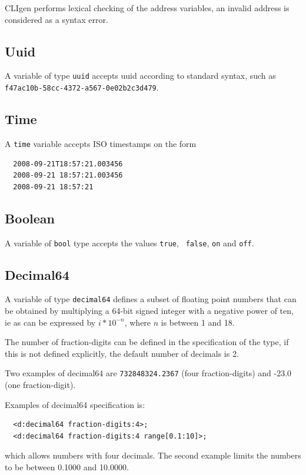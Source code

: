 \documentclass[a4paper, 10pt] {article}
\begin{document}
CLIgen performs lexical checking of the address variables, an invalid
address is considered as a syntax error.

\subsection{Uuid}

A variable of type {\tt uuid} accepts uuid according to standard syntax,
such as {\tt f47ac10b-58cc-4372-a567-0e02b2c3d479}. 


\subsection{Time}

A {\tt time} variable accepts ISO timestamps on the form

\begin{verbatim}
  2008-09-21T18:57:21.003456
  2008-09-21 18:57:21.003456
  2008-09-21 18:57:21
\end{verbatim}

\subsection{Boolean}

A variable of {\tt bool} type accepts the values {\tt true}, {\tt
  false}, {\tt on} and {\tt off}.

\subsection{Decimal64}

A variable of type {\tt decimal64} defines a subset of floating point
numbers that can be obtained by multiplying a 64-bit signed integer
with a negative power of ten, ie as can be expressed by $i * 10^{-n}$,
where $n$ is between 1 and 18.

The number of fraction-digits can be defined in the specification of
the type, if this is not defined explicitly, the default number of decimals is 2.

Two examples of decimal64 are {\tt 732848324.2367} (four
fraction-digits) and -23.0 (one fraction-digit).

Examples of decimal64 specification is:
\begin{verbatim}
  <d:decimal64 fraction-digits:4>;
  <d:decimal64 fraction-digits:4 range[0.1:10]>;
\end{verbatim}
which allows numbers with four decimals. The second example limits the numbers to be between 0.1000 and 10.0000.
\end{document}
